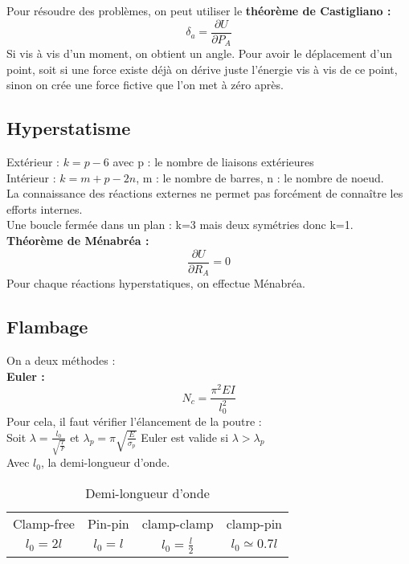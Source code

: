 \documentclass[../main.tex]{subfiles}
\begin{document}
Pour résoudre des problèmes, on peut utiliser le \textbf{théorème de Castigliano :}\\
\begin{equation}
    \delta_a = \frac{\partial U}{\partial P_A}
\end{equation}
Si vis à vis d'un moment, on obtient un angle. Pour avoir le déplacement d'un point, soit si une force existe déjà on dérive juste l'énergie vis à vis de ce point, sinon on crée une force fictive que l'on met à zéro après.\\

\subsection{Hyperstatisme}
Extérieur : $k = p-6$ avec p : le nombre de liaisons extérieures\\
Intérieur : $k = m+p-2n$, m : le nombre de barres, n : le nombre de noeud.\\
\warning La connaissance des réactions externes ne permet pas forcément de connaître les efforts internes.\\
Une boucle fermée dans un plan : k=3 mais deux symétries donc k=1.\\
\textbf{Théorème de Ménabréa :}\\
\begin{equation}
    \frac{\partial U}{\partial R_A} = 0
\end{equation}
Pour chaque réactions hyperstatiques, on effectue Ménabréa.\\

\subsection{Flambage}
On a deux méthodes : \\

\textbf{Euler :}\\
\begin{equation}
    N_c = \frac{\pi^2 EI}{l_0^2}
\end{equation}
Pour cela, il faut vérifier l'élancement de la poutre :\\
Soit $\lambda = \frac{l_0}{\sqrt{\frac{I}{F}}}$ et $\lambda_p = \pi \sqrt{\frac{E}{\sigma_p}}$
Euler est valide si $\lambda > \lambda_p$\\
Avec $l_0$, la demi-longueur d'onde. \\
\begin{table}[hbt!]
    \centering
    \begin{tabular}{||c|c|c|c|}
       \hline
       Clamp-free& Pin-pin & clamp-clamp & clamp-pin \\
       $l_0 = 2l$ & $l_0 = l$ & $l_0 = \frac{l}{2}$ & $l_0 \simeq 0.7l$\\
    \hline
    \end{tabular}
    \caption{Demi-longueur d'onde}
\end{table}
\end{document}
